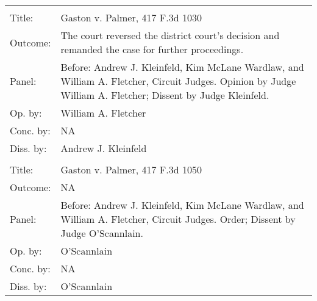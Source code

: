 \documentclass[10pt, letterpaper]{article}
\begin{document}
\begin{spacing}{1.0}
\begin{footnotesize}
\begin{longtable}[H]{lp{6in}}
        \arrayrulecolor{black}\hline\\[-4pt]
        Title: & Gaston v. Palmer, 417 F.3d 1030\\[2pt]
        Outcome: & The court reversed the district court's decision and remanded the case for further proceedings.\\[2pt]
        Panel: & Before: Andrew J. Kleinfeld, Kim McLane Wardlaw, and William A. Fletcher, Circuit Judges. Opinion by Judge William A. Fletcher; Dissent by Judge Kleinfeld.  \\[2pt]
        Op. by: & William A.  Fletcher \\[2pt]
        Conc. by: & NA\\[2pt]
        Diss. by: & Andrew J. Kleinfeld\\[2pt]
        \arrayrulecolor{gray}\hline\\[-4pt]
        Title: & Gaston v. Palmer, 417 F.3d 1050\\[2pt]
        Outcome: & NA\\[2pt]
        Panel: & Before: Andrew J. Kleinfeld, Kim McLane Wardlaw, and William A. Fletcher, Circuit Judges. Order; Dissent by Judge O'Scannlain.  \\[2pt]
        Op. by: & O'Scannlain\\[2pt]
        Conc. by: & NA\\[2pt]
        Diss. by: & O'Scannlain\\[2pt]
        

\end{longtable}
\end{footnotesize}
\end{spacing}
\end{document}
